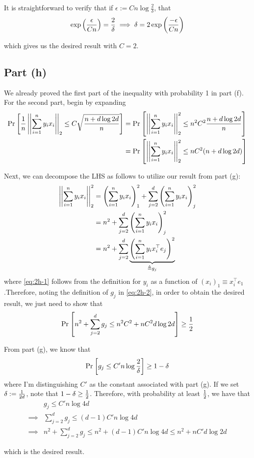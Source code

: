 \documentclass[11pt]{article}
\newcommand{\1}{\mathbb{I}} %
\begin{document}
It is straightforward to verify that if $\epsilon := Cn \log \frac{2}{\delta}$, that 
\begin{align}
	\exp\left(  \frac{\epsilon}{Cn}  \right) = \frac{2}{\delta} 
	\implies 
	\delta = 2\exp \left( \frac{-\epsilon}{Cn} \right)
\end{align}

which gives us the desired result with $C = 2$. 





\clearpage 
\subsection*{Part (h)}

We already proved the first part of the inequality with probability 1 in part (f). For the second part, begin by expanding
\begin{align}
	\text{Pr}_{}\left[\frac{1}{n} \left|\left| \sum_{i=1}^{n} y_i x_i \right|\right|_{2} \leq C \sqrt{\frac{n + d \log2d}{n}} \right] 
		&= \text{Pr}_{}\left[ \left|\left| \sum_{i=1}^{n} y_i x_i \right|\right|_{2}^2 \leq n^2 C^2 \frac{n + d\log2d}{n} \right] \\
		&= \text{Pr}_{}\left[\left|\left| \sum_{i=1}^{n} y_i x_i \right|\right|_{2}^2 \leq n C^2 (n + d \log2d) \right]
\end{align}

Next, we can decompose the LHS as follows to utilize our result from part (g):
\begin{align}
	\left|\left| \sum_{i=1}^{n} y_i x_i \right|\right|_{2}^2
		&= \left(  \sum_{i=1}^{n} y_i x_i  \right)^2_1 + \sum_{j = 2}^{d} \left(  \sum_{i=1}^{n} y_i x_i  \right)^2_j \\
		&= n^2 +  \sum_{j = 2}^{d} \left(  \sum_{i=1}^{n} y_i x_i  \right)^2_j \label{eq:2h-1} \\
		&= n^2 + \sum_{j = 2}^{d} \underbrace{ \left(  \sum_{i=1}^{n} y_i x_i^\top e_j  \right)^2 }_{\triangleq g_j} \label{eq:2h-2}
\end{align}
where \ref{eq:2h-1} follows from the definition for $y_i$ as a function of $(x_i)_1 \equiv x_i^\top e_1$.Therefore, noting the definition of $g_j$ in \ref{eq:2h-2},  in order to obtain the desired result, we just need to show that
\begin{align}
	\text{Pr}_{}\left[ n^2 + \sum_{j = 2}^{d} g_j  \leq n^2 C^2 + n C^2 d \log 2d \right] \geq \frac{1}{2} 
\end{align}

From part (g), we know that 
\begin{align}
	\text{Pr}_{}\left[g_j \leq C'n \log\frac{2}{\delta} \right] \geq 1 - \delta 
\end{align}
where I'm distinguishing $C'$ as the constant associated with part (g). If we set $\delta := \frac{1}{2d}$, note that $1 - \delta \geq \frac{1}{2}$. Therefore, with probability at least $\frac{1}{2}$, we have that 
\begin{align}
		&g_j \leq C'n \log 4d \\
		\implies
			& \sum_{j = 2}^{d} g_j \leq (d -1) C' n \log 4d \\
		\implies 
			&n^2  +  \sum_{j = 2}^{d} g_j \leq n^2 + (d -1) C' n \log 4d 
			\leq n^2 + n C' d \log 2d 
\end{align}

which is the desired result. 
\end{document}

